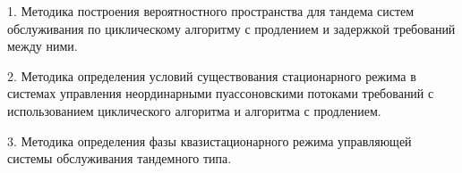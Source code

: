 



{}


1. Методика построения вероятностного пространства для тандема систем обслуживания по циклическому алгоритму с продлением и задержкой требований между ними.

2. Методика определения условий существования стационарного режима в системах управления неординарными пуассоновскими потоками требований с использованием циклического алгоритма и алгоритма с продлением.

3. Методика определения фазы квазистационарного режима  управляющей системы обслуживания тандемного типа.








